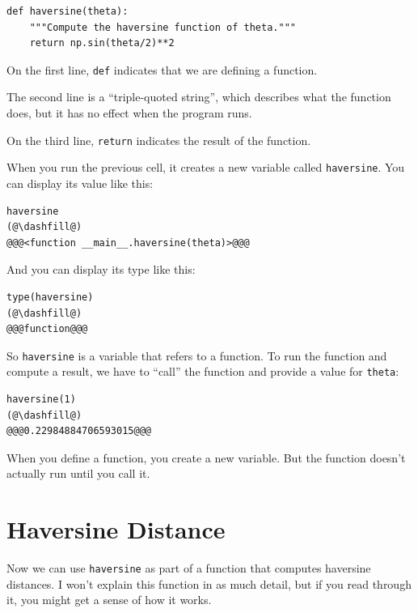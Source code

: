 \begin{lstlisting}[]
def haversine(theta):
    """Compute the haversine function of theta."""
    return np.sin(theta/2)**2
\end{lstlisting}

On the first line, \passthrough{\lstinline!def!} indicates that we are
defining a function.

The second line is a ``triple-quoted string'', which describes what the
function does, but it has no effect when the program runs.

On the third line, \passthrough{\lstinline!return!} indicates the result
of the function.

When you run the previous cell, it creates a new variable called
\passthrough{\lstinline!haversine!}. You can display its value like
this:

\begin{lstlisting}[]
haversine
(@\dashfill@)
@@@<function __main__.haversine(theta)>@@@
\end{lstlisting}

And you can display its type like this:

\begin{lstlisting}[]
type(haversine)
(@\dashfill@)
@@@function@@@
\end{lstlisting}

So \passthrough{\lstinline!haversine!} is a variable that refers to a
function. To run the function and compute a result, we have to ``call''
the function and provide a value for \passthrough{\lstinline!theta!}:

\begin{lstlisting}[]
haversine(1)
(@\dashfill@)
@@@0.22984884706593015@@@
\end{lstlisting}

When you define a function, you create a new variable. But the function
doesn't actually run until you call it.

\hypertarget{haversine-distance}{%
\section{Haversine Distance}\label{haversine-distance}}

Now we can use \passthrough{\lstinline!haversine!} as part of a function
that computes haversine distances. I won't explain this function in as
much detail, but if you read through it, you might get a sense of how it
works.

